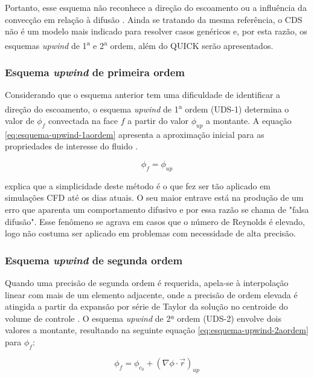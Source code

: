 Portanto, esse esquema não reconhece a direção do escoamento ou a influência da convecção em relação à difusão \cite{malalasekera2007}. Ainda se tratando da mesma referência, o CDS não é um modelo mais indicado para resolver casos genéricos e, por esta razão, os esquemas \textit{upwind} de 1\textsuperscript{a} e 2\textsuperscript{a} ordem, além do QUICK serão apresentados.

\subsubsection{Esquema \textit{upwind} de primeira ordem}

Considerando que o esquema anterior tem uma dificuldade de identificar a direção do escoamento, o esquema \textit{upwind} de 1\textsuperscript{a} ordem (UDS-1) determina o valor de \(\phi_f\) convectada na face \(f\) a partir do valor \(\phi_{up}\) a montante. A equação \ref{eq:esquema-upwind-1aordem} apresenta a aproximação inicial para as propriedades de interesse do fluido \cite{Rezende2009}.

\begin{equation}\label{eq:esquema-upwind-1aordem}
	\phi_f = \phi_{up}
\end{equation}

\citeauthor{malalasekera2007} explica que a simplicidade deste método é o que fez ser tão aplicado em simulações CFD até os dias atuais. O seu maior entrave está na produção de um erro que aparenta um comportamento difusivo e por essa razão se chama de "falsa difusão". Esse fenômeno se agrava em casos que o número de Reynolds é elevado, logo não costuma ser aplicado em problemas com necessidade de alta precisão.

\subsubsection{Esquema \textit{upwind} de segunda ordem}

Quando uma precisão de segunda ordem é requerida, apela-se à interpolação linear com mais de um elemento adjacente, onde a precisão de ordem elevada é atingida a partir da expansão por série de Taylor da solução no centroide do volume de controle \cite{Rezende2009}. O esquema \textit{upwind} de 2ª ordem (UDS-2) envolve dois valores a montante, resultando na seguinte equação \ref{eq:esquema-upwind-2aordem} para \(\phi_f\):

\begin{equation} \label{eq:esquema-upwind-2aordem}
    \phi_f = \phi_{c_0} + \left(\nabla\phi\cdot\overrightarrow{r}\right)_{up}
\end{equation}

